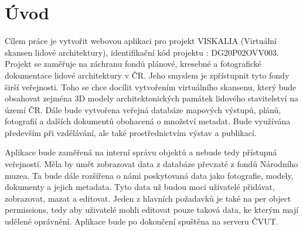 \chapter*{Úvod}
\label{0-uvod}


Cílem práce je vytvořit webovou aplikaci pro projekt VISKALIA
(Virtuální skansen lidové architektury), identifikační kód projektu
: DG20P02OVV003. Projekt se zaměřuje na
záchranu fondů plánové, kresebné a fotografické dokumentace lidové
architektury v ČR. Jeho smyslem je zpřístupnit tyto fondy širší
veřejnosti. Toho se chce docílit vytvořením virtuálního skansenu,
který bude obsahovat zejména 3D modely architektonických památek
lidového stavitelství na území ČR. Dále bude vytvořena veřejná
databáze mapových výstupů, plánů, fotografií a dalších dokumentů
obohacená o množství metadat. Bude využívána především při vzdělávání,
ale také prostřednictvím výstav a publikací.

Aplikace bude zaměřená na interní správu objektů a nebude tedy přístupná
veřejností. Měla by umět zobrazovat data z databáze převzaté
z fondů Národního muzea. Ta bude dále rozšířena o námi poskytovaná
data jako fotografie, modely, dokumenty a jejich metadata. Tyto data
už budou moci uživatelé přidávat, zobrazovat, mazat a editovat. Jeden
z hlavních požadavků je také na per object permissions, tedy aby
uživatelé mohli editovat pouze taková data, ke kterým mají udělené
oprávnění. Aplikace bude po dokončení spuštěna na serveru ČVUT.


